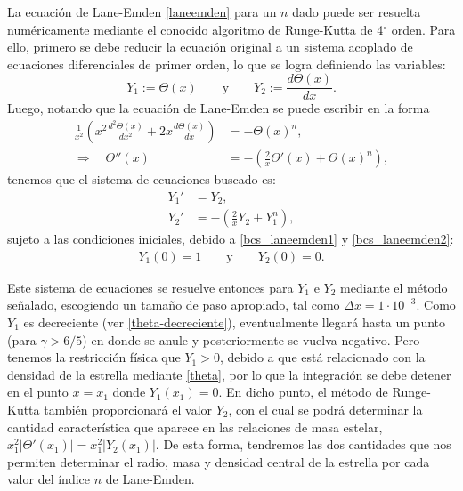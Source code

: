 La ecuación de Lane-Emden \eqref{laneemden} para un $n$ dado puede ser resuelta  numéricamente mediante el conocido algoritmo de Runge-Kutta de 4${}^{\circ}$ orden. Para ello, primero se debe reducir la ecuación original a un sistema acoplado de ecuaciones diferenciales de primer orden, lo que se logra definiendo las variables:
\begin{equation}
Y_1:=\Theta(x)\qquad\text{y}\qquad Y_2:=\frac{d\Theta(x)}{dx}.
\end{equation}
Luego, notando que la ecuación de Lane-Emden se puede escribir en la forma
\begin{align}
 \frac{1}{x^2}\left(x^2\frac{d^2\Theta(x)}{dx^2}+2x\frac{d\Theta(x)}{dx}\right)&=-\Theta(x)^n,\\
\Rightarrow\quad \Theta''(x)&=-\left(\frac{2}{x}\Theta'(x)+\Theta(x)^n\right),
\end{align}
tenemos que el sistema de ecuaciones buscado es:
\begin{equation}
\boxed{
\begin{aligned}
 Y_1'&=Y_2,\\
Y_2'&=-\left(\frac{2}{x}Y_2+Y_1^n\right),
\end{aligned}}
\end{equation}
sujeto a las condiciones iniciales, debido a \eqref{bcs_laneemden1} y \eqref{bcs_laneemden2}:
\begin{align}
 Y_1(0)=1\qquad\text{y}\qquad Y_2(0)=0.
\end{align}

Este sistema de ecuaciones se resuelve entonces para $Y_1$ e $Y_2$ mediante el método señalado, escogiendo un tamaño de paso apropiado, tal como $\Delta x=1\cdot10^{-3}$. Como $Y_1$ es decreciente (ver \eqref{theta-decreciente}), eventualmente llegará hasta un punto (para $\gamma>6/5$) en donde se anule y posteriormente se vuelva negativo. Pero tenemos la restricción física que $Y_1>0$, debido a que está relacionado con la densidad de la estrella mediante \eqref{theta}, por lo que la integración se debe detener en el punto $x=x_1$ donde $Y_1(x_1)=0$. En dicho punto, el método de Runge-Kutta también proporcionará el valor $Y_2$, con el cual se podrá determinar la cantidad característica que aparece en las relaciones de masa estelar, $x_1^2\left|\Theta'(x_1)\right|=x_1^2\left|Y_2(x_1)\right|$. De esta forma, tendremos las dos cantidades que nos permiten determinar el radio, masa y densidad central de la estrella por cada valor del índice $n$ de Lane-Emden.

